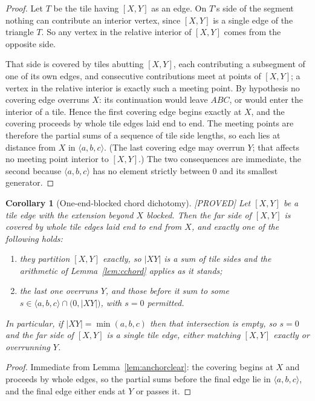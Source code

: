 \documentclass[11pt,reqno]{amsart}
\theoremstyle{plain}
\newtheorem{corollary}[theorem]{Corollary}
\theoremstyle{definition}
\newcommand{\lab}[1]{\hfill\textnormal{\footnotesize\textsc{[#1]}}}
\begin{document}
\begin{proof}
Let $T$ be the tile having $[X,Y]$ as an edge. On $T$'s side of the segment nothing can contribute an
interior vertex, since $[X,Y]$ is a single edge of the triangle $T$. So any vertex in the relative
interior of $[X,Y]$ comes from the opposite side.

That side is covered by tiles abutting $[X,Y]$, each contributing a subsegment of one of its own
edges, and consecutive contributions meet at points of $[X,Y]$; a vertex in the relative interior is
exactly such a meeting point. By hypothesis no covering edge overruns $X$: its continuation would
leave $ABC$, or would enter the interior of a tile. Hence the first covering edge begins exactly at
$X$, and the covering proceeds by whole tile edges laid end to end. The meeting points are therefore
the partial sums of a sequence of tile side lengths, so each lies at distance from $X$ in
$\langle a,b,c\rangle$. (The last covering edge may overrun $Y$; that affects no meeting point
interior to $[X,Y]$.) The two consequences are immediate, the second because
$\langle a,b,c\rangle$ has no element strictly between $0$ and its smallest generator.
\end{proof}

\begin{corollary}[One-end-blocked chord dichotomy]\label{cor:onebloc}\lab{PROVED}
Let $[X,Y]$ be a tile edge with the extension beyond $X$ blocked. Then the far side of $[X,Y]$ is
covered by whole tile edges laid end to end from $X$, and exactly one of the following holds:
\begin{enumerate}
\item[\textup{(i)}] they partition $[X,Y]$ exactly, so $|XY|$ is a sum of tile sides and the
arithmetic of Lemma~\ref{lem:cchord} applies as it stands;
\item[\textup{(ii)}] the last one overruns $Y$, and those before it sum to some
$s\in\langle a,b,c\rangle\cap\bigl(0,|XY|\bigr)$, with $s=0$ permitted.
\end{enumerate}
In particular, if $|XY|=\min(a,b,c)$ then that intersection is empty, so $s=0$ and the far side of
$[X,Y]$ is a \emph{single} tile edge, either matching $[X,Y]$ exactly or overrunning $Y$.
\end{corollary}

\begin{proof}
Immediate from Lemma~\ref{lem:anchorclear}: the covering begins at $X$ and proceeds by whole edges,
so the partial sums before the final edge lie in $\langle a,b,c\rangle$, and the final edge either
ends at $Y$ or passes it.
\end{proof}
\end{document}
